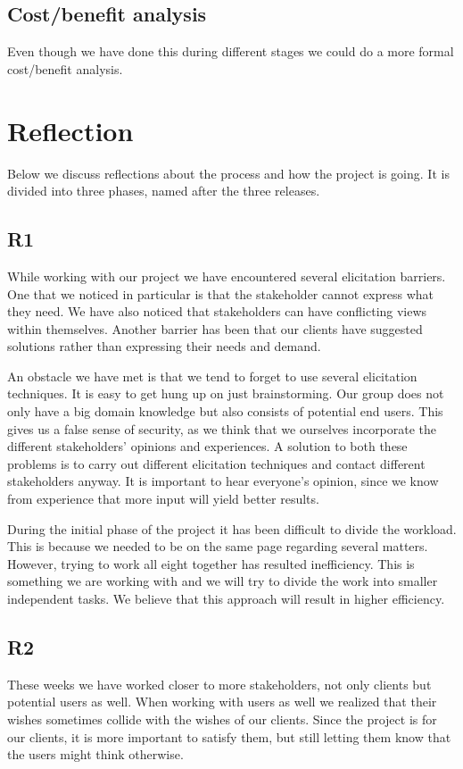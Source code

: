 \documentclass[a4paper]{article}
\begin{document}
	\subsection{Cost/benefit analysis}
	Even though we have done this during different stages we could do a more formal cost/benefit analysis.

	\section{Reflection}
	Below we discuss reflections about the process and how the project is going. It is divided into three phases, named after the three releases.
	
\subsection{R1}
While working with our project we have encountered several elicitation barriers. One that we noticed in particular is that the stakeholder cannot express what they need. We have also noticed that stakeholders can have conflicting views within themselves. Another barrier has been that our clients have suggested solutions rather than expressing their needs and demand.

An obstacle we have met is that we tend to forget to use several elicitation techniques. It is easy to get hung up on just brainstorming. Our group does not only have a big domain knowledge but also consists of potential end users. This gives us a false sense of security, as we think that we ourselves incorporate the different stakeholders' opinions and experiences. A solution to both these problems is to carry out different elicitation techniques and contact different stakeholders anyway. It is important to hear everyone's opinion, since we know from experience that more input will yield better results.

During the initial phase of the project it has been difficult to divide the workload. This is because we needed to be on the same page regarding several matters. However, trying to work all eight together has resulted inefficiency. This is something we are working with and we will try to divide the work into smaller independent tasks. We believe that this approach will result in higher efficiency.
\subsection{R2}
These weeks we have worked closer to more stakeholders, not only clients but potential users as well. When working with users as well we realized that their wishes sometimes collide with the wishes of our clients. Since the project is for our clients, it is more important to satisfy them, but still letting them know that the users might think otherwise.
\end{document}

